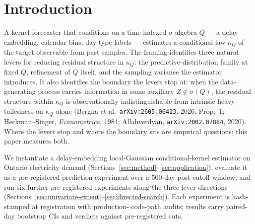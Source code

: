 \section{Introduction}
\label{sec:intro}

A kernel forecaster that conditions on a time-indexed
$\sigma$-algebra $Q$ --- a delay embedding, calendar bins,
day-type labels --- estimates a conditional law $\kappa_Q$ of
the target observable from past samples. The framing identifies
three natural levers for reducing residual structure in $\kappa_Q$:
the predictive-distribution family at fixed $Q$, refinement of
$Q$ itself, and the sampling variance the estimator introduces.
It also identifies the boundary the levers stop at: when the
data-generating process carries information in some auxiliary
$Z \notin \sigma(Q)$, the residual structure within $\kappa_Q$
is observationally indistinguishable from intrinsic heavy-tailedness
on $\kappa_Q$ alone (Bergna et al.\ \texttt{arXiv:2605.06413},
2026, Prop.~1; Heckman--Singer, \emph{Econometrica}, 1984;
Allahverdyan, \texttt{arXiv:2002.07884}, 2020). Where the levers
stop and where the boundary sits are empirical questions; this
paper measures both.

We instantiate a delay-embedding local-Gaussian conditional-kernel
estimator on Ontario electricity demand
(Sections~\ref{sec:method}--\ref{sec:application}), evaluate it
as a pre-registered prediction experiment over a $500$-day
post-cutoff window, and run six further pre-registered experiments
along the three lever directions
(Sections~\ref{sec:univariate-extent}--\ref{sec:directed-search}).
Each experiment is hash-stamped at registration with production-
code-path audits; results carry paired-day bootstrap CIs and
verdicts against pre-registered cuts.

